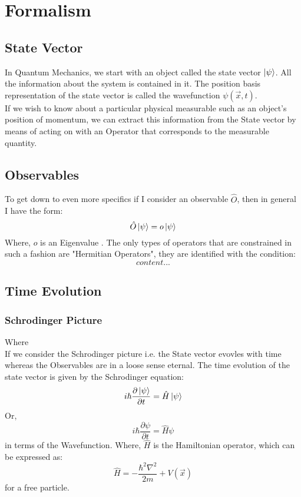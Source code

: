 \chapter{Formalism}
\section{State Vector}
In Quantum Mechanics, we start with an object called the state vector $\ket{\psi}$. All the information about the system is contained in it. The position basis representation of the state vector is called the wavefunction $\psi (\vec{x}, t)$. \\
If we wish to know about a particular physical measurable such as an object's position of momentum, we can extract this information from the State vector by means of acting on with an Operator that corresponds to the measurable quantity.\\
\section{Observables}
To get down to even more specifics if I consider an observable $\hat{O}$, then in general I have the form:
\begin{equation}
	\hat{O} \ket{\psi} = o \ket{\psi}
\end{equation}
Where, $o$ is an Eigenvalue . The only types of operators that are constrained in such a fashion are "Hermitian Operators", they are identified with the condition:
\begin{equation}
	content...
\end{equation}
\section{Time Evolution}
\subsection{Schrodinger Picture}
Where\\
If we consider the Schrodinger picture i.e. the State vector evovles with time whereas the Observables are in a loose sense eternal. The time evolution of the state vector is given by the Schrodinger equation:
\begin{equation}
	i \hbar \frac{\partial \ket{\psi}}{\partial t} = \hat{H} \ket{\psi}
\end{equation}
Or,
\begin{equation}
	i \hbar \frac{\partial \psi}{\partial t} = \hat{H} \psi
\end{equation}
in terms of the Wavefunction. Where, $\hat{H}$ is the Hamiltonian operator, which can be expressed as:
\begin{equation}
	\hat{H} = -\frac{\hbar^{2} \nabla^2}{2m} + V(\vec{x})
\end{equation}
for a free particle. 

